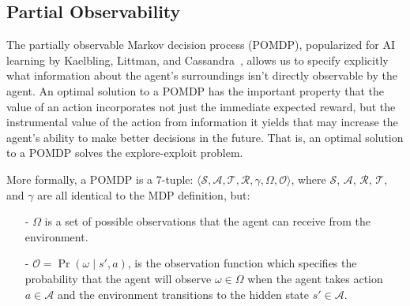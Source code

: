 \documentclass[11pt]{article}
\newcommand\jmnote[1]{\textcolor{red}{James: #1}}
\begin{document}
\subsection{Partial Observability}

The partially observable Markov decision process (POMDP), popularized for AI learning by Kaelbling, Littman, and Cassandra~, allows us to specify explicitly what information about the agent's surroundings 
isn't directly observable by the agent. An optimal solution to a POMDP has the important property that the value of an action incorporates not just the immediate expected reward, but the instrumental value of the action from information it yields that may increase the agent's ability to make better decisions in the future. That is, an optimal solution to a POMDP solves the explore-exploit problem.  

More formally, a POMDP is a $7$-tuple: $\langle \mathcal{S},\mathcal{A},\mathcal{T},\mathcal{R}, \gamma, \Omega,\mathcal{O} \rangle$, where $\mathcal{S}$, $\mathcal{A}$, $\mathcal{R}$, $\mathcal{T}$, and $\gamma$ are all identical to the MDP definition, but:
\begin{itemize}
\item[-] $\Omega$ is a set of possible observations that the agent can receive from the environment.
\item[-] $\mathcal{O} = \Pr(\omega \mid s', a)$, is the observation function which specifies the probability that the agent will observe $\omega \in \Omega$ when the agent takes action $a \in \mathcal{A}$ and the environment transitions to the hidden state $s' \in \mathcal{A}$.
\end{itemize}
\end{document}
